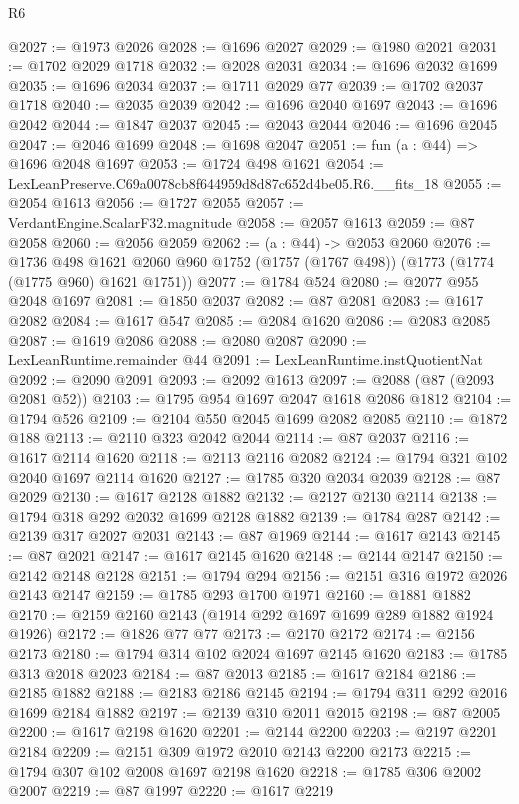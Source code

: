 \begin{lexlean}{R6}
\begin{coremodule}
@2027 := @1973 @2026
@2028 := @1696 @2027
@2029 := @1980 @2021
@2031 := @1702 @2029 @1718
@2032 := @2028 @2031
@2034 := @1696 @2032 @1699
@2035 := @1696 @2034
@2037 := @1711 @2029 @77
@2039 := @1702 @2037 @1718
@2040 := @2035 @2039
@2042 := @1696 @2040 @1697
@2043 := @1696 @2042
@2044 := @1847 @2037
@2045 := @2043 @2044
@2046 := @1696 @2045
@2047 := @2046 @1699
@2048 := @1698 @2047
@2051 := fun (a : @44) => @1696 @2048 @1697
@2053 := @1724 @498 @1621
@2054 := LexLeanPreserve.C69a0078cb8f644959d8d87c652d4be05.R6.__fits_18
@2055 := @2054 @1613
@2056 := @1727 @2055
@2057 := VerdantEngine.ScalarF32.magnitude
@2058 := @2057 @1613
@2059 := @87 @2058
@2060 := @2056 @2059
@2062 := (a : @44) -> @2053 @2060
@2076 := @1736
    @498
    @1621
    @2060
    @960
    @1752
    (@1757 (@1767 @498))
    (@1773 (@1774 (@1775 @960) @1621 @1751))
@2077 := @1784 @524
@2080 := @2077 @955 @2048 @1697
@2081 := @1850 @2037
@2082 := @87 @2081
@2083 := @1617 @2082
@2084 := @1617 @547
@2085 := @2084 @1620
@2086 := @2083 @2085
@2087 := @1619 @2086
@2088 := @2080 @2087
@2090 := LexLeanRuntime.remainder @44
@2091 := LexLeanRuntime.instQuotientNat
@2092 := @2090 @2091
@2093 := @2092 @1613
@2097 := @2088 (@87 (@2093 @2081 @52))
@2103 := @1795 @954 @1697 @2047 @1618 @2086 @1812
@2104 := @1794 @526
@2109 := @2104 @550 @2045 @1699 @2082 @2085
@2110 := @1872 @188
@2113 := @2110 @323 @2042 @2044
@2114 := @87 @2037
@2116 := @1617 @2114 @1620
@2118 := @2113 @2116 @2082
@2124 := @1794 @321 @102 @2040 @1697 @2114 @1620
@2127 := @1785 @320 @2034 @2039
@2128 := @87 @2029
@2130 := @1617 @2128 @1882
@2132 := @2127 @2130 @2114
@2138 := @1794 @318 @292 @2032 @1699 @2128 @1882
@2139 := @1784 @287
@2142 := @2139 @317 @2027 @2031
@2143 := @87 @1969
@2144 := @1617 @2143
@2145 := @87 @2021
@2147 := @1617 @2145 @1620
@2148 := @2144 @2147
@2150 := @2142 @2148 @2128
@2151 := @1794 @294
@2156 := @2151 @316 @1972 @2026 @2143 @2147
@2159 := @1785 @293 @1700 @1971
@2160 := @1881 @1882
@2170 := @2159 @2160 @2143 (@1914 @292 @1697 @1699 @289 @1882 @1924 @1926)
@2172 := @1826 @77 @77
@2173 := @2170 @2172
@2174 := @2156 @2173
@2180 := @1794 @314 @102 @2024 @1697 @2145 @1620
@2183 := @1785 @313 @2018 @2023
@2184 := @87 @2013
@2185 := @1617 @2184
@2186 := @2185 @1882
@2188 := @2183 @2186 @2145
@2194 := @1794 @311 @292 @2016 @1699 @2184 @1882
@2197 := @2139 @310 @2011 @2015
@2198 := @87 @2005
@2200 := @1617 @2198 @1620
@2201 := @2144 @2200
@2203 := @2197 @2201 @2184
@2209 := @2151 @309 @1972 @2010 @2143 @2200 @2173
@2215 := @1794 @307 @102 @2008 @1697 @2198 @1620
@2218 := @1785 @306 @2002 @2007
@2219 := @87 @1997
@2220 := @1617 @2219

\end{coremodule}
\end{lexlean}
